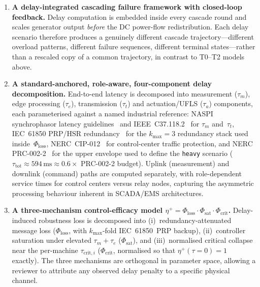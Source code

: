 \begin{enumerate}
\item \textbf{A delay-integrated cascading failure framework with
  closed-loop feedback.}  Delay computation is embedded inside every
  cascade round and scales generator output \emph{before} the
  DC power-flow redistribution.  Each delay scenario therefore
  produces a genuinely different cascade trajectory---different
  overload patterns, different failure sequences, different terminal
  states---rather than a rescaled copy of a common trajectory, in
  contrast to T0--T2 models above.

\item \textbf{A standard-anchored, role-aware, four-component delay
  decomposition.}  End-to-end latency is decomposed into measurement
  ($\tau_m$), edge processing ($\tau_e$), transmission ($\tau_t$) and
  actuation/UFLS ($\tau_a$) components, each parameterised against a
  named industrial reference: NASPI synchrophasor latency
  guidelines~\citep{NASPI_LatencyGuidelines} and
  IEEE~C37.118.2~\citep{IEEE_C37_118_2} for $\tau_m$ and~$\tau_t$,
  IEC~61850 PRP/HSR redundancy~\citep{IEC_61850_PRP} for the
  $k_{\max}=3$ redundancy stack used inside~$\Phi_{\mathrm{loss}}$,
  NERC~CIP-012~\citep{NERC_CIP012} for control-center traffic
  protection, and NERC PRC-002-2~\citep{NERC_PRC002} for the upper
  envelope used to define the \texttt{heavy} scenario
  ($\tau_{\mathrm{tot}}\!\approx\!594\,\mathrm{ms}\!\approx\!0.6\times$
  PRC-002-2 budget).  Uplink (measurement) and downlink (command)
  paths are computed separately, with role-dependent service times
  for control centers versus relay nodes, capturing the asymmetric
  processing behaviour inherent in SCADA/EMS architectures.

\item \textbf{A three-mechanism control-efficacy model
  $\eta^{+}=\Phi_{\mathrm{loss}}\!\cdot\!\Phi_{\mathrm{sat}}\!\cdot\!
  \Phi_{\mathrm{crit}}$.}  Delay-induced robustness loss is
  decomposed into (i)~redundancy-attenuated message loss
  ($\Phi_{\mathrm{loss}}$, with $k_{\max}$-fold IEC~61850~PRP backup),
  (ii)~controller saturation under elevated $\tau_m+\tau_e$
  ($\Phi_{\mathrm{sat}}$), and (iii)~normalised critical collapse
  near the per-machine $\tau_{\mathrm{crit},i}$
  ($\Phi_{\mathrm{crit}}$, normalised so that
  $\eta^{+}(\tau\!=\!0)\!=\!1$ exactly).  The three mechanisms are
  orthogonal in parameter space, allowing a reviewer to attribute any
  observed delay penalty to a specific physical channel.


\end{enumerate}
